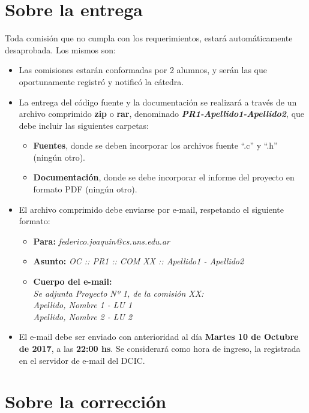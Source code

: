 \documentclass[12pt,a4paper]{article}
\begin{document}
\section*{Sobre la entrega}
Toda comisión que no cumpla con los requerimientos, estará automáticamente desaprobada. Los mismos son:
\begin{itemize}
		
	\item Las comisiones estarán conformadas por 2 alumnos, y serán las que oportunamente registró y notificó la cátedra.
		
	\item La entrega del código fuente y la documentación se realizará a través de un archivo comprimido \textbf{zip} o \textbf{rar}, denominado \textbf{\textit{PR1-Apellido1-Apellido2}}, que debe incluir las siguientes carpetas:
	\begin{itemize}
		\item \textbf{Fuentes}, donde se deben incorporar los archivos fuente “.c” y “.h” (ningún otro).
		\item \textbf{Documentación}, donde se debe incorporar el informe del proyecto en formato PDF (ningún otro).
	\end{itemize}		
	\item El archivo comprimido debe enviarse por e-mail, respetando el siguiente formato: 
	\begin{itemize}
		\item \textbf{Para:} \textit{federico.joaquin@cs.uns.edu.ar}
		\item \textbf{Asunto:} \textit{OC :: PR1 :: COM XX :: Apellido1 - Apellido2}
		\item \textbf{Cuerpo del e-mail:} \\
		\textit{Se adjunta Proyecto Nº 1, de la comisión XX: } \\
		\textit{Apellido, Nombre 1 - LU 1} \\
		\textit{Apellido, Nombre 2 - LU 2}
	\end{itemize}
	
	\item El e-mail debe ser enviado con anterioridad al día \textbf{Martes 10 de Octubre de 2017}, a las \textbf{22:00 hs}. Se considerará como hora de ingreso, la registrada en el servidor de e-mail del DCIC.
		
\end{itemize}

\section*{Sobre la corrección}
\end{document}
